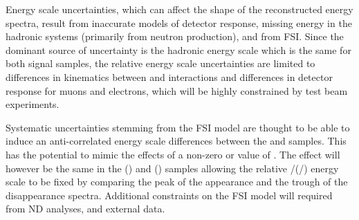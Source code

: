 
Energy scale uncertainties, which can affect the shape of the reconstructed energy spectra, result from
inaccurate models of detector response, missing energy in the hadronic systems (primarily from neutron production),
and from FSI. Since the dominant source of uncertainty is the hadronic energy scale which is the same for both
signal samples, the relative energy scale uncertainties are limited to differences in kinematics
between \numu and \nue interactions and differences in detector response for muons and electrons,
which will be highly constrained by test beam experiments.

Systematic uncertainties stemming from the FSI model are thought to be able to induce an anti-correlated 
energy scale differences between the \nu and \anu samples. This has the potential to mimic the effects
of a non-zero or \pi value of \deltacp. The effect will however be the same in the \nue (\anue) and \numu
(\anumu) samples allowing the relative \nue/\numu (\anue/\anumu) energy scale to be fixed by comparing
the peak of the appearance and the trough of the disappearance spectra. Additional constraints on the FSI 
model will required from ND analyses, and external data.


